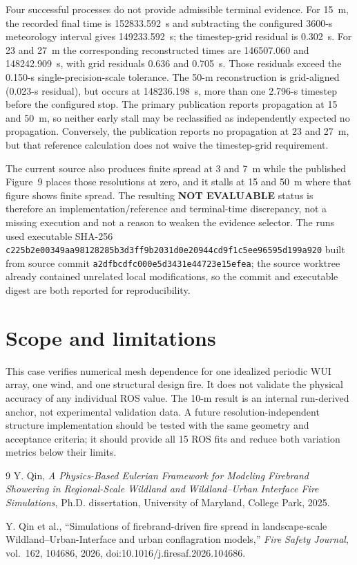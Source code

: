 Four successful processes do not provide admissible terminal evidence.  For
15~m, the recorded final time is 152833.592~s and subtracting the configured
3600-s meteorology interval gives 149233.592~s; the timestep-grid residual is
0.302~s.  For 23 and 27~m the corresponding reconstructed times are
146507.060 and 148242.909~s, with grid residuals 0.636 and 0.705~s.  Those
residuals exceed the 0.150-s single-precision-scale tolerance.  The 50-m
reconstruction is grid-aligned (0.023-s residual), but occurs at 148236.198~s,
more than one 2.796-s timestep before the configured stop.  The primary
publication reports propagation at 15 and 50~m, so neither early stall may be
reclassified as independently expected no propagation.  Conversely, the
publication reports no propagation at 23 and 27~m, but that reference calculation does not
waive the timestep-grid requirement.

The current source also produces finite spread at 3 and 7~m while the published
Figure~9 places those resolutions at zero, and it stalls at 15 and 50~m where
that figure shows finite spread.  The resulting \textbf{NOT EVALUABLE} status
is therefore an implementation/reference and terminal-time discrepancy, not a
missing execution and not a reason to weaken the evidence selector.  The runs
used executable SHA-256
\texttt{c225b2e0\allowbreak 0349aa98\allowbreak 128285b3\allowbreak d3ff9b20\allowbreak 31d0e209\allowbreak 44cd9f1c\allowbreak 5ee96595\allowbreak d199a920}
built from source commit
\texttt{a2dfbcdf\allowbreak c000e5d3\allowbreak 431e4472\allowbreak 3e15efea}; the source worktree already
contained unrelated local modifications, so the commit and executable digest
are both reported for reproducibility.

\section{Scope and limitations}
This case verifies numerical mesh dependence for one idealized periodic WUI
array, one wind, and one structural design fire. It does not validate the
physical accuracy of any individual ROS value. The 10-m result is an internal
run-derived anchor, not experimental validation data. A future
resolution-independent structure implementation should be tested with the same
geometry and acceptance criteria; it should provide all 15 ROS fits and reduce
both variation metrics below their limits.

\begin{thebibliography}{9}
Y. Qin, \emph{A Physics-Based Eulerian Framework for Modeling Firebrand
Showering in Regional-Scale Wildland and Wildland--Urban Interface Fire
Simulations}, Ph.D. dissertation, University of Maryland, College Park, 2025.

Y. Qin et al., ``Simulations of firebrand-driven fire spread in
landscape-scale Wildland--Urban-Interface and urban conflagration models,''
\emph{Fire Safety Journal}, vol.~162, 104686, 2026,
doi:10.1016/j.firesaf.2026.104686.
\end{thebibliography}
